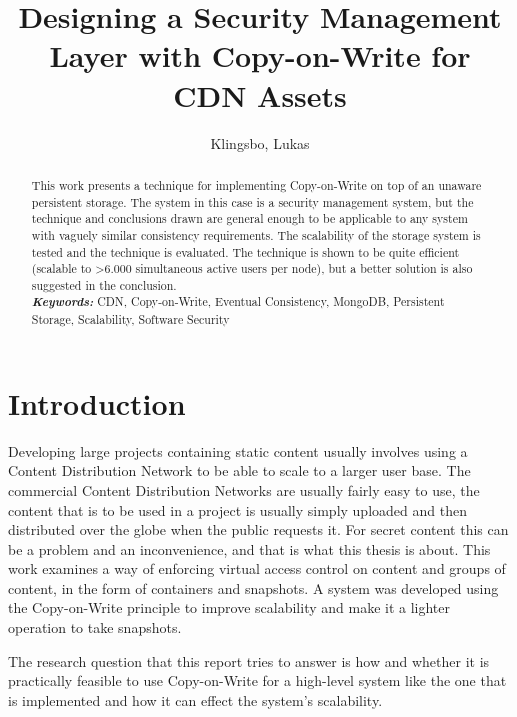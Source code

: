 \documentclass[a4paper,12pt]{article}
\title{\textbf{Designing a Security Management Layer with Copy-on-Write for CDN Assets}}
\author{Klingsbo, Lukas}
\providecommand{\keywords}[1]{\textbf{\textit{Keywords: }} #1}
\begin{document}
\maketitle
%

\setcounter{page}{1}

%

\begin{abstract}
This work presents a technique for implementing Copy-on-Write on top of an unaware persistent
storage. The system in this case is a security management system, but the technique and conclusions
drawn are general enough to be applicable to any system with vaguely similar consistency
requirements. The scalability of the storage system is tested and the technique is evaluated. The
technique is shown to be quite efficient (scalable to >6.000 simultaneous active users per node),
but a better solution is also suggested in the conclusion.\\

\keywords{CDN, Copy-on-Write, Eventual Consistency, MongoDB, Persistent Storage, Scalability, 
Software Security}
\end{abstract}

\newpage\null\thispagestyle{empty}\newpage

\setcounter{tocdepth}{3}
\tableofcontents

\clearpage
{}
\setcounter{page}{1}

\section{Introduction}
Developing large projects containing static content usually involves using a Content Distribution
Network to be able to scale to a larger user base. The commercial Content Distribution Networks are
usually fairly easy to use, the content that is to be used in a project is usually simply uploaded
and then distributed over the globe when the public requests it. For secret content this can be a
problem and an inconvenience, and that is what this thesis is about. This work examines a way of
enforcing virtual access control on content and groups of content, in the form of containers and
snapshots. A system was developed using the Copy-on-Write principle to improve scalability and make
it a lighter operation to take snapshots. 

The research question that this report tries to answer is how and whether it is practically 
feasible to use Copy-on-Write for a high-level system like the one that is implemented and how 
it can effect the system's scalability. 
\end{document}
